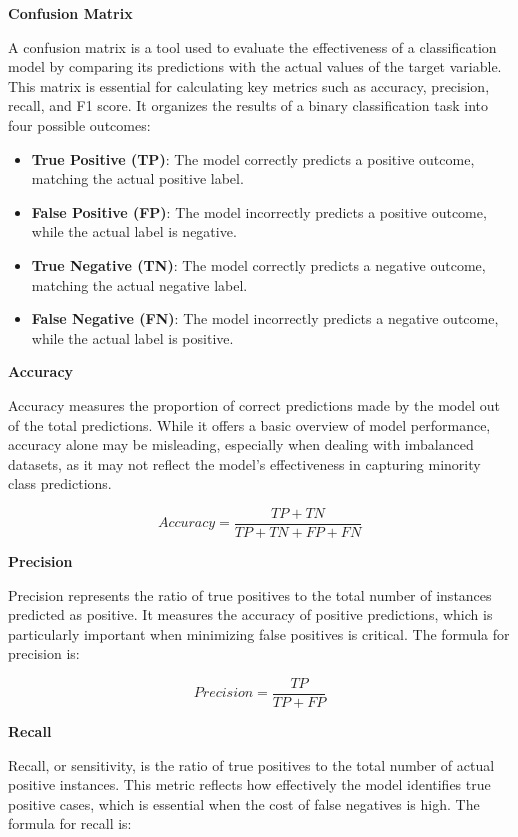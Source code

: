 \documentclass[12pt]{report}
\begin{document}
    {\bfseries Confusion Matrix}

    A confusion matrix is a tool used to evaluate the effectiveness of a classification model by comparing its predictions with the actual values of the target variable. This matrix is essential for calculating key metrics such as accuracy, precision, recall, and F1 score. It organizes the results of a binary classification task into four possible outcomes:

    \begin{itemize}
        \item {\bfseries True Positive (TP)}: The model correctly predicts a positive outcome, matching the actual positive label.
        \item {\bfseries False Positive (FP)}: The model incorrectly predicts a positive outcome, while the actual label is negative.
        \item {\bfseries True Negative (TN)}: The model correctly predicts a negative outcome, matching the actual negative label.
        \item {\bfseries False Negative (FN)}: The model incorrectly predicts a negative outcome, while the actual label is positive.
    \end{itemize}

    {\bfseries Accuracy}

    Accuracy measures the proportion of correct predictions made by the model out of the total predictions. While it offers a basic overview of model performance, accuracy alone may be misleading, especially when dealing with imbalanced datasets, as it may not reflect the model’s effectiveness in capturing minority class predictions.

    \[Accuracy = \frac{TP + TN}{TP + TN + FP + FN}\]

    {\bfseries Precision}

    Precision represents the ratio of true positives to the total number of instances predicted as positive. It measures the accuracy of positive predictions, which is particularly important when minimizing false positives is critical. The formula for precision is:

    \[Precision = \frac{TP}{TP + FP}\]

    {\bfseries Recall}

    Recall, or sensitivity, is the ratio of true positives to the total number of actual positive instances. This metric reflects how effectively the model identifies true positive cases, which is essential when the cost of false negatives is high. The formula for recall is:
\end{document}
